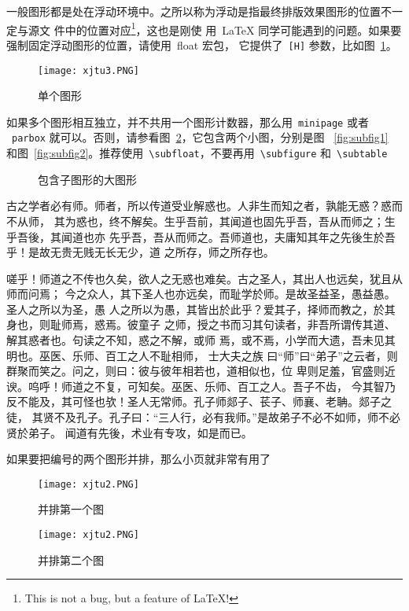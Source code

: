 \documentclass[%
               amsthm,
              ]{xjtubsc}
\begin{document}
一般图形都是处在浮动环境中。之所以称为浮动是指最终排版效果图形的位置不一定与源文
件中的位置对应\footnote{This is not a bug, but a feature of \LaTeX!}，这也是刚使
用~\LaTeX{} 同学可能遇到的问题。如果要强制固定浮动图形的位置，请使用~\textsf{float} 宏包，
它提供了~\texttt{[H]} 参数，比如图~\ref{fig:xfig1}。
\begin{figure}[H] 
  \centering
  \texttt{[image: xjtu3.PNG]}
  \caption{单个图形}
  \label{fig:xfig1}
\end{figure}
如果多个图形相互独立，并不共用一个图形计数器，那么用~\verb|minipage| 或者
~\verb|parbox| 就可以。否则，请参看图~\ref{fig:big1}，它包含两个小图，分别是图
~\ref{fig:subfig1} 和图~\ref{fig:subfig2}。推荐使用~\verb|\subfloat|，不要再用~\verb|\subfigure|
和~\verb|\subtable|
\begin{figure}[h]
  \centering%
  \hspace{4em}%
  \caption{包含子图形的大图形}
  \label{fig:big1}
\end{figure}

古之学者必有师。师者，所以传道受业解惑也。人非生而知之者，孰能无惑？惑而不从师，
其为惑也，终不解矣。生乎吾前，其闻道也固先乎吾，吾从而师之；生乎吾後，其闻道也亦
先乎吾，吾从而师之。吾师道也，夫庸知其年之先後生於吾乎！是故无贵无贱无长无少，道
之所存，师之所存也。

嗟乎！师道之不传也久矣，欲人之无惑也难矣。古之圣人，其出人也远矣，犹且从师而问焉；
今之众人，其下圣人也亦远矣，而耻学於师。是故圣益圣，愚益愚。圣人之所以为圣，愚
人之所以为愚，其皆出於此乎？爱其子，择师而教之，於其身也，则耻师焉，惑焉。彼童子
之师，授之书而习其句读者，非吾所谓传其道、解其惑者也。句读之不知，惑之不解，或师
焉，或不焉，小学而大遗，吾未见其明也。巫医、乐师、百工之人不耻相师，  士大夫之族
曰“师”曰“弟子”之云者，则群聚而笑之。问之，则曰：彼与彼年相若也，道相似也，位
卑则足羞，官盛则近谀。呜呼！师道之不复，可知矣。巫医、乐师、百工之人。吾子不齿，
今其智乃反不能及，其可怪也欤！圣人无常师。孔子师郯子、苌子、师襄、老聃。郯子之徒，
其贤不及孔子。孔子曰：“三人行，必有我师。”是故弟子不必不如师，师不必贤於弟子。
闻道有先後，术业有专攻，如是而已。

如果要把编号的两个图形并排，那么小页就非常有用了
\begin{figure}[h]
\begin{minipage}{0.48\textwidth}
  \centering
  \texttt{[image: xjtu2.PNG]}
  \caption{并排第一个图}
  \label{fig:parallel1}
\end{minipage}\hfill
\begin{minipage}{0.48\textwidth}
  \centering
  \texttt{[image: xjtu2.PNG]}
  \caption{并排第二个图}
  \label{fig:parallel2}
\end{minipage}
\end{figure}
\end{document}
